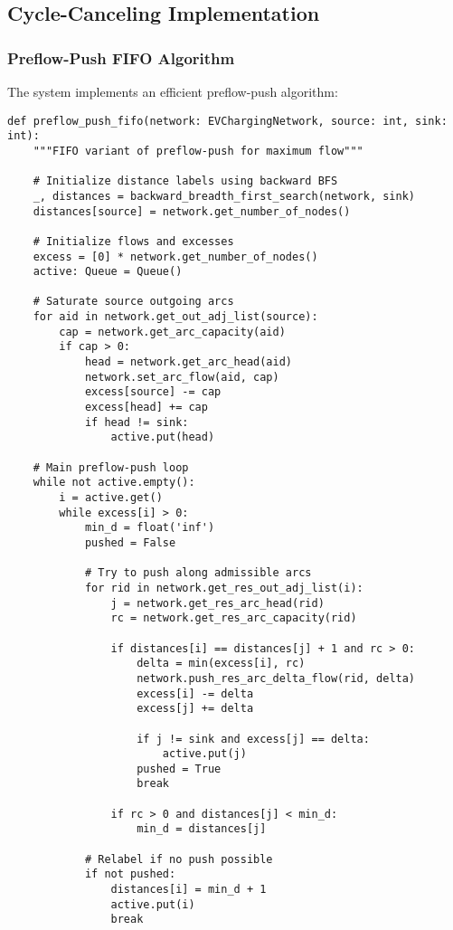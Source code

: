\documentclass[12pt,a4paper]{article}
\begin{document}
\subsection{Cycle-Canceling Implementation}

\subsubsection{Preflow-Push FIFO Algorithm}
The system implements an efficient preflow-push algorithm:

\begin{lstlisting}[caption=Preflow-Push FIFO Implementation]
def preflow_push_fifo(network: EVChargingNetwork, source: int, sink: int):
    """FIFO variant of preflow-push for maximum flow"""
    
    # Initialize distance labels using backward BFS
    _, distances = backward_breadth_first_search(network, sink)
    distances[source] = network.get_number_of_nodes()
    
    # Initialize flows and excesses
    excess = [0] * network.get_number_of_nodes()
    active: Queue = Queue()
    
    # Saturate source outgoing arcs
    for aid in network.get_out_adj_list(source):
        cap = network.get_arc_capacity(aid)
        if cap > 0:
            head = network.get_arc_head(aid)
            network.set_arc_flow(aid, cap)
            excess[source] -= cap
            excess[head] += cap
            if head != sink:
                active.put(head)
    
    # Main preflow-push loop
    while not active.empty():
        i = active.get()
        while excess[i] > 0:
            min_d = float('inf')
            pushed = False
            
            # Try to push along admissible arcs
            for rid in network.get_res_out_adj_list(i):
                j = network.get_res_arc_head(rid)
                rc = network.get_res_arc_capacity(rid)
                
                if distances[i] == distances[j] + 1 and rc > 0:
                    delta = min(excess[i], rc)
                    network.push_res_arc_delta_flow(rid, delta)
                    excess[i] -= delta
                    excess[j] += delta
                    
                    if j != sink and excess[j] == delta:
                        active.put(j)
                    pushed = True
                    break
                
                if rc > 0 and distances[j] < min_d:
                    min_d = distances[j]
            
            # Relabel if no push possible
            if not pushed:
                distances[i] = min_d + 1
                active.put(i)
                break
\end{lstlisting}
\end{document}
